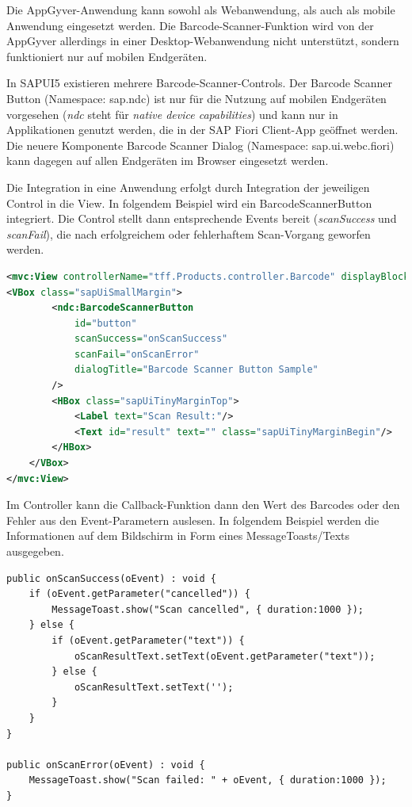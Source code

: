Die AppGyver-Anwendung kann sowohl als Webanwendung, als auch als mobile Anwendung eingesetzt werden. Die Barcode-Scanner-Funktion wird von der AppGyver allerdings in einer Desktop-Webanwendung nicht unterstützt, sondern funktioniert nur auf mobilen Endgeräten.

In SAPUI5 existieren mehrere Barcode-Scanner-Controls.  Der Barcode Scanner Button (Namespace: sap.ndc) ist nur für die Nutzung auf mobilen Endgeräten vorgesehen (\textit{ndc} steht für \textit{native device capabilities}) und kann nur in Applikationen genutzt werden, die in der SAP Fiori Client-App geöffnet werden. Die neuere Komponente Barcode Scanner Dialog (Namespace: sap.ui.webc.fiori) kann dagegen auf allen Endgeräten im Browser eingesetzt werden.

Die Integration in eine Anwendung erfolgt durch Integration der jeweiligen Control in die View. In folgendem Beispiel wird ein BarcodeScannerButton integriert. Die Control stellt dann entsprechende Events bereit (\textit{scanSuccess} und \textit{scanFail}), die nach erfolgreichem oder fehlerhaftem Scan-Vorgang geworfen werden. 
\begin{lstlisting}[language=XML,  caption=Implementierung Barcode-Scanner in \texttt{Barcode.view.xml}]
<mvc:View controllerName="tff.Products.controller.Barcode" displayBlock="true" xmlns:ndc="sap.ndc" xmlns="sap.m" xmlns:mvc="sap.ui.core.mvc">
<VBox class="sapUiSmallMargin">
		<ndc:BarcodeScannerButton
			id="button"
			scanSuccess="onScanSuccess"
			scanFail="onScanError"
			dialogTitle="Barcode Scanner Button Sample"
		/>
		<HBox class="sapUiTinyMarginTop">
			<Label text="Scan Result:"/>
			<Text id="result" text="" class="sapUiTinyMarginBegin"/>
		</HBox>
	</VBox>
</mvc:View>
\end{lstlisting}

Im Controller kann die Callback-Funktion dann den Wert des Barcodes oder den Fehler aus den Event-Parametern auslesen. In folgendem Beispiel werden die Informationen auf dem Bildschirm in Form eines MessageToasts/Texts ausgegeben. 
\begin{lstlisting}[emph={event, cancelled, duration, text, Scan failed, Scan cancelled},  caption=Implementierung Barcode-Scanner in \texttt{Barcode.controller.ts}]
public onScanSuccess(oEvent) : void {
	if (oEvent.getParameter("cancelled")) {
		MessageToast.show("Scan cancelled", { duration:1000 });
	} else {
		if (oEvent.getParameter("text")) {
			oScanResultText.setText(oEvent.getParameter("text"));
		} else {
			oScanResultText.setText('');
		}
	}
}

public onScanError(oEvent) : void {
	MessageToast.show("Scan failed: " + oEvent, { duration:1000 });
}
\end{lstlisting}

